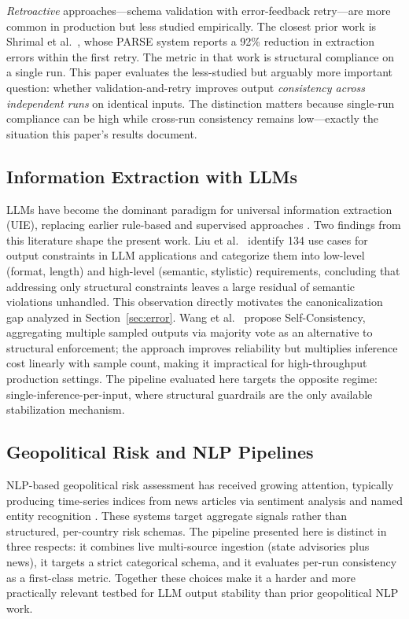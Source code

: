 \documentclass[sigconf]{acmart}
\begin{document}
\emph{Retroactive} approaches---schema validation with error-feedback retry---are more common in production but less studied empirically. The closest prior work is Shrimal et al.\ \cite{shrimal2025parse}, whose PARSE system reports a 92\% reduction in extraction errors within the first retry. The metric in that work is structural compliance on a single run. This paper evaluates the less-studied but arguably more important question: whether validation-and-retry improves output \emph{consistency across independent runs} on identical inputs. The distinction matters because single-run compliance can be high while cross-run consistency remains low---exactly the situation this paper's results document.

\subsection{Information Extraction with LLMs}

LLMs have become the dominant paradigm for universal information extraction (UIE), replacing earlier rule-based and supervised approaches \cite{li2024simple}. Two findings from this literature shape the present work. Liu et al.\ \cite{liu2024we} identify 134 use cases for output constraints in LLM applications and categorize them into low-level (format, length) and high-level (semantic, stylistic) requirements, concluding that addressing only structural constraints leaves a large residual of semantic violations unhandled. This observation directly motivates the canonicalization gap analyzed in Section~\ref{sec:error}. Wang et al.\ \cite{wang2022self} propose Self-Consistency, aggregating multiple sampled outputs via majority vote as an alternative to structural enforcement; the approach improves reliability but multiplies inference cost linearly with sample count, making it impractical for high-throughput production settings. The pipeline evaluated here targets the opposite regime: single-inference-per-input, where structural guardrails are the only available stabilization mechanism.

\subsection{Geopolitical Risk and NLP Pipelines}

NLP-based geopolitical risk assessment has received growing attention, typically producing time-series indices from news articles via sentiment analysis and named entity recognition \cite{caldara2022measuring}. These systems target aggregate signals rather than structured, per-country risk schemas. The pipeline presented here is distinct in three respects: it combines live multi-source ingestion (state advisories plus news), it targets a strict categorical schema, and it evaluates per-run consistency as a first-class metric. Together these choices make it a harder and more practically relevant testbed for LLM output stability than prior geopolitical NLP work.
\end{document}
